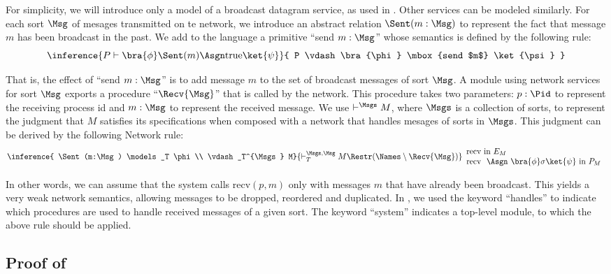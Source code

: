 For simplicity, we will introduce only a model of a broadcast datagram
service, as used in \Toy. Other services can be modeled similarly. For
each sort $\Msg$ of mesages transmitted on te network, we introduce an
abstract relation $\Sent(m:\Msg)$ to represent the fact that message
$m$ has been broadcast in the past.  We add to the language a
primitive ``send $m:\Msg$'' whose semantics is defined by the
following rule:
\[{\inference{ P \vdash \bra{\phi} \Sent(m) \Asgn \mbox{true} \ket{\psi} }
            { P \vdash \bra{\phi} \mbox{send $m$} \ket{\psi} }}
 \]

That is, the effect of ``send $m:\Msg$'' is to add message $m$ to the
set of broadcast messages of sort $\Msg$. A module using network services for sort $\Msg$ exports a
procedure ``$\Recv{\Msg}$'' that is called by the network. This procedure takes two parameters:
$p:\Pid$ to represent the receiving process id and $m:\Msg$ to represent the received message.
We use $\vdash^\Msgs M$, where $\Msgs$ is a collection of sorts, to represent the judgment that $M$ satisfies its specifications
when composed with a network that handles mesages of sorts in $\Msgs$.
This judgment can be derived by the following Network rule:
\[{\inference{ \Sent(m:\Msg) \models_T \phi \\ \vdash_T^{\Msgs} M}
             { \vdash_T^{\Msgs,\Msg} M \Restr (\Names \setminus \Recv{\Msg}) }}
{
  \begin{array}{l}
    \mbox{recv in $E_M$} \\
    \mbox{recv $\ \Asgn\ \bra{\phi} \sigma \ket{\psi}$ in $P_M$}
  \end{array}
}
 \]

 \begin{sloppypar}
In other words, we can assume that the system calls $\mbox{recv}(p,m)$ only
 with messages $m$ that have already been broadcast.  This
 yields a very weak network semantics, allowing messages to be
 dropped, reordered and duplicated. In \Lang, we used the keyword ``handles'' to indicate
which procedures are used to handle received messages of a given sort. The keyword ``system'' indicates
a top-level module, to which the above rule should be applied.
\end{sloppypar}

\subsection{Proof of \Toy}

